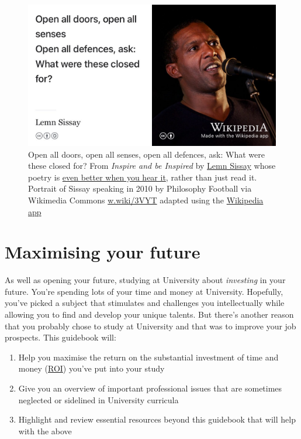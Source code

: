 \documentclass[
]{book}
\providecommand{\tightlist}{%
  \setlength{\itemsep}{0pt}\setlength{\parskip}{0pt}}
\begin{document}
\begin{figure}

{\centering \includegraphics[width=0.99\linewidth]{images/lemninspire} 

}

\caption{Open all doors, open all senses, open all defences, ask: What were these closed for? From \emph{Inspire and be Inspired} by \href{https://en.wikipedia.org/wiki/Lemn_Sissay}{Lemn Sissay} whose poetry is \href{https://www.youtube.com/watch?v=WzZs1w3NWzg}{even better when you hear it}, rather than just read it. \citep{sissay} Portrait of Sissay speaking in 2010 by Philosophy Football via Wikimedia Commons \href{https://w.wiki/3VYT}{w.wiki/3VYT} adapted using the \href{https://apps.apple.com/gb/app/wikipedia/id324715238}{Wikipedia app}}\label{fig:lemn-fig}
\end{figure}



\hypertarget{roi}{%
\section{Maximising your future}\label{roi}}

As well as opening your future, studying at University about \emph{investing} in your future. You're spending lots of your time and money at University. Hopefully, you've picked a subject that stimulates and challenges you intellectually while allowing you to find and develop your unique talents. But there's another reason that you probably chose to study at University and that was to improve your job prospects. This guidebook will:

\begin{enumerate}
\def\labelenumi{\arabic{enumi}.}
\tightlist
\item
  Help you maximise the return on the substantial investment of time and money (\href{https://en.wikipedia.org/wiki/Return_on_investment}{ROI}) you've put into your study
\item
  Give you an overview of important professional issues that are sometimes neglected or sidelined in University curricula
\item
  Highlight and review essential resources beyond this guidebook that will help with the above
\end{enumerate}
\end{document}
